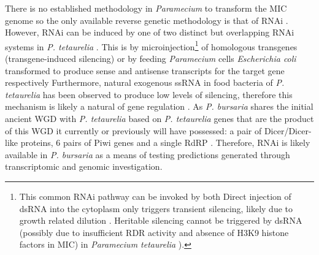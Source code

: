 There is no established methodology in \textit{Paramecium} to transform the MIC genome so the only available reverse genetic methodology is that of
RNAi \citep{Marker2014a}.  However, RNAi can be induced by one of two distinct but overlapping RNAi systems in \textit{P. tetaurelia} \citep{Marker2014a}.
This is by microinjection\footnote{ This common RNAi pathway can be invoked by both Direct injection of dsRNA into the cytoplasm only triggers transient silencing, likely due to growth related dilution \citep{Galvani2002}.
Heritable silencing cannot be triggered by dsRNA (possibly due to insufficient RDR activity and absence of H3K9 histone factors in MIC) in \textit{Paramecium tetaurelia} \citep{Kiefer2013}).}
of homologous transgenes (transgene-induced silencing) or by feeding \textit{Paramecium} cells
\textit{Escherichia coli} transformed to produce sense and antisense transcripts for the target gene respectively \citep{Galvani2002}
Furthermore, natural exogenous ssRNA in food bacteria of \textit{P. tetaurelia} has been observed to produce low levels of silencing, therefore this mechanism
is likely a natural of gene regulation \citep{Carradec2015}.
As \textit{P. bursaria} shares the initial ancient WGD with \textit{P. tetaurelia} \citep{Aury2006} based on \textit{P. tetaurelia} genes that are the 
product of this WGD it currently or previously will have possessed: a pair of Dicer/Dicer-like proteins, 6 pairs of Piwi genes and a single RdRP \citep{Marker2014a}.
Therefore, RNAi is likely available in \textit{P. bursaria} as a means of testing predictions generated through transcriptomic and genomic investigation.


